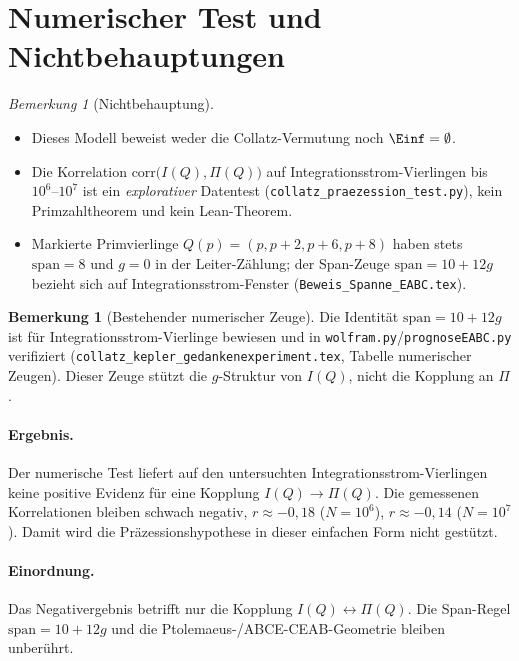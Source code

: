 \documentclass[11pt,a4paper]{article}
\theoremstyle{definition}
\newtheorem{bemerkung}[definition]{Bemerkung}
\theoremstyle{remark}
\newtheorem{remark}[definition]{Bemerkung}
\begin{document}
\section{Numerischer Test und Nichtbehauptungen}

\begin{remark}[Nichtbehauptung]
  \begin{itemize}[nosep]
    \item Dieses Modell beweist weder die Collatz-Vermutung noch
    $\Einf=\emptyset$.
    \item Die Korrelation $\mathrm{corr}\bigl(I(Q),\Pi(Q)\bigr)$ auf
    Integrationsstrom-Vierlingen bis $10^6$--$10^7$ ist ein
    \emph{explorativer} Datentest (\texttt{collatz\_praezession\_test.py}),
    kein Primzahltheorem und kein Lean-Theorem.
    \item Markierte Primvierlinge $Q(p)=(p,p+2,p+6,p+8)$ haben stets
    $\mathrm{span}=8$ und $g=0$ in der Leiter-Zählung; der Span-Zeuge
    $\mathrm{span}=10+12g$ bezieht sich auf Integrationsstrom-Fenster
    (\texttt{Beweis\_Spanne\_EABC.tex}).
  \end{itemize}
\end{remark}

\begin{bemerkung}[Bestehender numerischer Zeuge]
  Die Identität $\mathrm{span}=10+12g$ ist für Integrationsstrom-Vierlinge
  bewiesen und in \texttt{wolfram.py}/\texttt{prognoseEABC.py} verifiziert
  (\texttt{collatz\_kepler\_gedankenexperiment.tex}, Tabelle numerischer Zeugen).
  Dieser Zeuge stützt die $g$-Struktur von $I(Q)$, nicht die Kopplung an $\Pi$.
\end{bemerkung}

\paragraph{Ergebnis.}
Der numerische Test liefert auf den untersuchten Integrationsstrom-Vierlingen keine positive Evidenz für eine Kopplung $I(Q)\to\Pi(Q)$.
Die gemessenen Korrelationen bleiben schwach negativ, $r\approx -0{,}18$ ($N=10^6$), $r\approx -0{,}14$ ($N=10^7$).
Damit wird die Präzessionshypothese in dieser einfachen Form nicht gestützt.

\paragraph{Einordnung.}
Das Negativergebnis betrifft nur die Kopplung $I(Q)\leftrightarrow\Pi(Q)$.
Die Span-Regel $\mathrm{span}=10+12g$ und die Ptolemaeus-/ABCE-CEAB-Geometrie bleiben unberührt.
\end{document}

